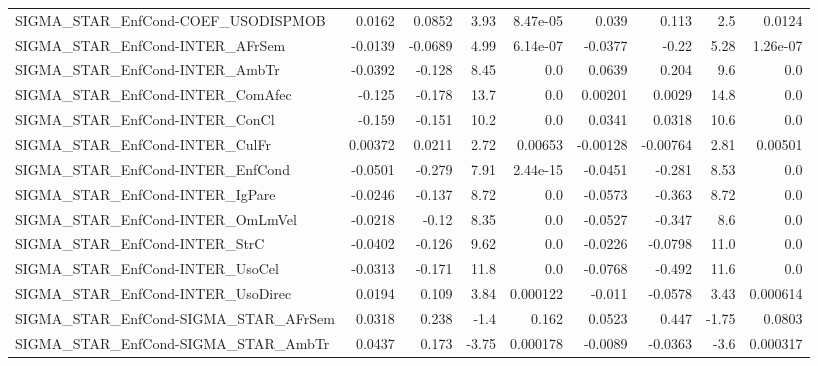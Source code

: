 \begin{tabular}{lrrrrrrrr}
SIGMA\_STAR\_EnfCond-COEF\_USODISPMOB     &      0.0162 &       0.0852 &     3.93 & 8.47e-05 &      0.039 &       0.113 &          2.5 &        0.0124 \\
SIGMA\_STAR\_EnfCond-INTER\_AFrSem        &     -0.0139 &      -0.0689 &     4.99 & 6.14e-07 &    -0.0377 &       -0.22 &         5.28 &      1.26e-07 \\
SIGMA\_STAR\_EnfCond-INTER\_AmbTr         &     -0.0392 &       -0.128 &     8.45 &      0.0 &     0.0639 &       0.204 &          9.6 &           0.0 \\
SIGMA\_STAR\_EnfCond-INTER\_ComAfec       &      -0.125 &       -0.178 &     13.7 &      0.0 &    0.00201 &      0.0029 &         14.8 &           0.0 \\
SIGMA\_STAR\_EnfCond-INTER\_ConCl         &      -0.159 &       -0.151 &     10.2 &      0.0 &     0.0341 &      0.0318 &         10.6 &           0.0 \\
SIGMA\_STAR\_EnfCond-INTER\_CulFr         &     0.00372 &       0.0211 &     2.72 &  0.00653 &   -0.00128 &    -0.00764 &         2.81 &       0.00501 \\
SIGMA\_STAR\_EnfCond-INTER\_EnfCond       &     -0.0501 &       -0.279 &     7.91 & 2.44e-15 &    -0.0451 &      -0.281 &         8.53 &           0.0 \\
SIGMA\_STAR\_EnfCond-INTER\_IgPare        &     -0.0246 &       -0.137 &     8.72 &      0.0 &    -0.0573 &      -0.363 &         8.72 &           0.0 \\
SIGMA\_STAR\_EnfCond-INTER\_OmLmVel       &     -0.0218 &        -0.12 &     8.35 &      0.0 &    -0.0527 &      -0.347 &          8.6 &           0.0 \\
SIGMA\_STAR\_EnfCond-INTER\_StrC          &     -0.0402 &       -0.126 &     9.62 &      0.0 &    -0.0226 &     -0.0798 &         11.0 &           0.0 \\
SIGMA\_STAR\_EnfCond-INTER\_UsoCel        &     -0.0313 &       -0.171 &     11.8 &      0.0 &    -0.0768 &      -0.492 &         11.6 &           0.0 \\
SIGMA\_STAR\_EnfCond-INTER\_UsoDirec      &      0.0194 &        0.109 &     3.84 & 0.000122 &     -0.011 &     -0.0578 &         3.43 &      0.000614 \\
SIGMA\_STAR\_EnfCond-SIGMA\_STAR\_AFrSem   &      0.0318 &        0.238 &     -1.4 &    0.162 &     0.0523 &       0.447 &        -1.75 &        0.0803 \\
SIGMA\_STAR\_EnfCond-SIGMA\_STAR\_AmbTr    &      0.0437 &        0.173 &    -3.75 & 0.000178 &    -0.0089 &     -0.0363 &         -3.6 &      0.000317 \\

\end{tabular}
